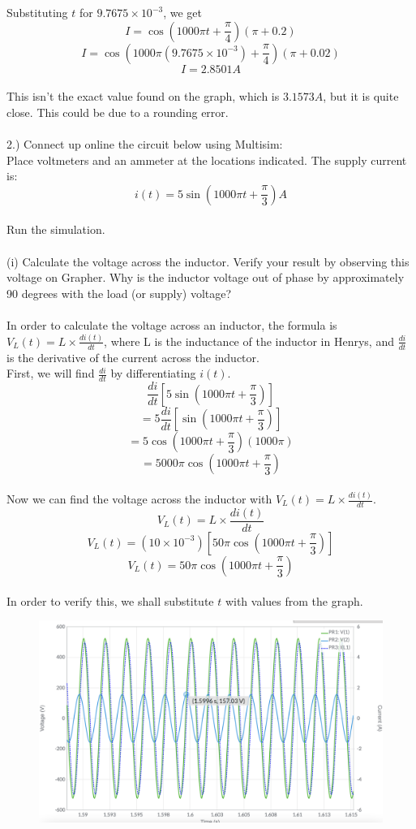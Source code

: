 \documentclass[12pt]{article}
\begin{document}
Substituting \(t\) for \(9.7675 \times 10^{-3}\), we get\\
\[I = \cos (1000\pi t + \frac{\pi}{4})(\pi + 0.2)\]
\[I = \cos (1000\pi (9.7675 \times 10^{-3}) + \frac{\pi}{4})(\pi + 0.02)\]
\[I = 2.8501A\]\\
This isn't the exact value found on the graph, which is \(3.1573A\), but it is quite close. This could be due to a rounding error.\\
\\
2.) Connect up online the circuit below using Multisim:\\
Place voltmeters and an ammeter at the locations indicated. The supply current is:\\
\[i(t) = 5 \sin (1000\pi t + \frac{\pi}{3})A\]\\
Run the simulation.\\
\\
(i) Calculate the voltage across the inductor. Verify your result by observing this voltage on Grapher. Why is the inductor voltage out of phase by approximately 90 degrees with the load (or supply) voltage?\\
\\
In order to calculate the voltage across an inductor, the formula is \(V_L(t) = L \times \frac{di(t)}{dt}\), where L is the inductance of the inductor in Henrys, and \(\frac{di}{dt}\) is the derivative of the current across the inductor.\\
First, we will find \(\frac{di}{dt}\) by differentiating \(i(t)\).\\
\[\frac{di}{dt}[5\sin (1000\pi t + \frac{\pi}{3})]\]
\[=5 \frac{di}{dt}[\sin (1000\pi t + \frac{\pi}{3})]\]
\[=5 \cos (1000\pi t + \frac{\pi}{3})(1000\pi)\]
\[=5000\pi \cos(1000\pi t + \frac{\pi}{3})\]\\
Now we can find the voltage across the inductor with \(V_L(t) = L \times \frac{di(t)}{dt}\).\\
\[V_L(t) = L \times \frac{di(t)}{dt}\]
\[V_L(t) = (10 \times 10^{-3})[50\pi \cos (1000 \pi t + \frac{\pi}{3})]\]
\[V_L(t) = 50\pi \cos (1000 \pi t + \frac{\pi}{3})\]\\
\newpage
In order to verify this, we shall substitute \(t\) with values from the graph.\\
\begin{figure}[!h] 
	\begin{centering}
		\includegraphics[keepaspectratio = true, width = 6in]{q2(i).png}
	\end{centering}
\end{figure}\\
\end{document}
